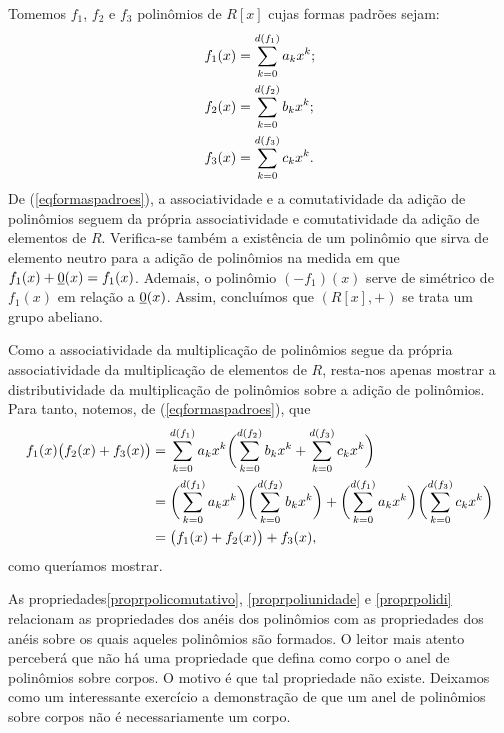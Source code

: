 \begin{dem}
  Tomemos $f_1$, $f_2$ e $f_3$ polinômios de $R[x]$ cujas formas padrões
  sejam:
  \begin{equation}\label{eqformaspadroes}
    \begin{aligned}
      f_1(x) &= \sum_{k=0}^{d(f_1)} a_kx^k\mathrm{;}\\
      f_2(x) &= \sum_{k=0}^{d(f_2)} b_kx^k\mathrm{;}\\
      f_3(x) &= \sum_{k=0}^{d(f_3)} c_kx^k\mathrm{.}\\
    \end{aligned}
  \end{equation}
  De (\ref{eqformaspadroes}), a associatividade e a comutatividade da
  adição de polinômios
  seguem da própria associatividade e comutatividade da adição de
  elementos de $R$. Verifica-se também a existência de um polinômio que
  sirva de elemento neutro para a adição de polinômios na medida em que
  $f_1(x)+\underline{0}(x)=f_1(x)$.
  Ademais, o polinômio $(-f_1)(x)$
  serve de
  simétrico de $f_1(x)$ em relação a $\underline{0}(x)$.
  Assim, concluímos que $(R[x],+)$ se trata um
  grupo abeliano.

  Como a associatividade da multiplicação de polinômios segue da própria
  associatividade da multiplicação de elementos de $R$, resta-nos apenas
  mostrar a distributividade da multiplicação de polinômios sobre a
  adição de polinômios. Para tanto, notemos, de
  (\ref{eqformaspadroes}),
    que
  \begin{equation*}
    \begin{aligned}
      f_1(x)\bigl(f_2(x)+f_3(x)\bigr)
      &= \sum_{k=0}^{d(f_1)} a_kx^k \biggl(
      \sum_{k=0}^{d(f_2)} b_kx^k + \sum_{k=0}^{d(f_3)} c_kx^k
      \biggr)\\
      &= \biggl(\sum_{k=0}^{d(f_1)} a_kx^k\biggr)
      \biggl(\sum_{k=0}^{d(f_2)} b_kx^k\biggr) +
      \biggl(\sum_{k=0}^{d(f_1)} a_kx^k\biggr)
      \biggl(\sum_{k=0}^{d(f_3)} c_kx^k\biggr)\\
      &= \bigl(f_1(x)+f_2(x)\bigr)+f_3(x)\mathrm{,}
    \end{aligned}
  \end{equation*}
  como queríamos mostrar.
\end{dem}

As
propriedades\xspace\ref{proprpolicomutativo},
\xspace\ref{proprpoliunidade}
e \xspace\ref{proprpolidi} relacionam as propriedades dos anéis dos
polinômios com as propriedades dos anéis sobre os quais aqueles
polinômios são formados. O leitor mais atento perceberá que não há uma
propriedade que defina como corpo o anel de polinômios sobre corpos. O
motivo é que tal propriedade não existe. Deixamos como um interessante
exercício a demonstração de que um anel de polinômios sobre corpos não é
necessariamente um corpo.

